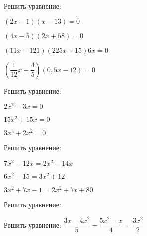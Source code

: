 \begin{class}[number=6]
	\begin{listofex}
		\item Решить уравнение:
		\begin{enumcols}[itemcolumns=2]
			\item \( (2x-1)(x-13)=0 \)
			\item \( (4x-5)(2x+58)=0 \)
			\item \( (11x-121)(225x+15)6x=0 \)
			\item \( \left( \dfrac{1}{12}x+\dfrac{4}{5} \right)(0,5x-12)=0 \)
		\end{enumcols}
		\item Решить уравнение:
		\begin{enumcols}[itemcolumns=3]
			\item \( 2x^2-3x=0 \)
			\item \( 15x^2+15x=0 \)
			\item \( 3x^3+2x^2=0 \)
		\end{enumcols}
		\item Решить уравнение:
		\begin{enumcols}[itemcolumns=2]
			\item {}
			\item \( 7x^2-12x=2x^2-14x \)
			\item \( 6x^2-15=3x^2+12 \)
			\item \( 3x^2+7x-1=2x^2+7x+80 \)
		\end{enumcols}
		\item Решить уравнение:
		\begin{enumcols}[itemcolumns=1]
			\item {}
			\item {}
		\end{enumcols}
		\item Решить уравнение: \( \dfrac{3x-4x^2}{5}-\dfrac{5x^2-x}{4}=\dfrac{3x^2}{2} \)
	\end{listofex}
\end{class}
%
%
%
